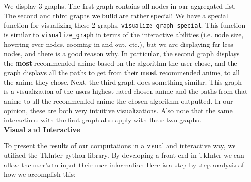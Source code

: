 \documentclass[fontsize=11pt]{article}
\begin{document}
We display 3 graphs. The first graph contains all nodes in our aggregated list. The second and third graphs we build are rather special! We have a special function for visualizing these 2 graphs, \texttt{visualize\_graph\_special}. This function is similar to \texttt{visualize\_graph} in terms of the interactive abilities (i.e. node size, hovering over nodes, zooming in and out, etc.), but we are displaying far less nodes, and there is a good reason why. In particular, the second graph displays the \textbf{most} recommended anime based on the algorithm the user chose, and the graph displays all the paths to get from their \textbf{most} recommended anime, to all the anime they chose. Next, the third graph does something similar. This graph is a visualization of the users highest rated chosen anime and the paths from that anime to all the recommended anime the chosen algorithm outputted. In our opinion, these are both very intuitive visualizations. Also note that the same interactions with the first graph also apply with these two graphs.  
\\


\textbf{Visual and Interactive}

\item[]To present the results of our computations in a visual and interactive way, we utilized the TkInter python library. By developing a front end in TkInter we can allow the user’s to input their user information Here is a step-by-step analysis of how we accomplish this:
\end{document}
